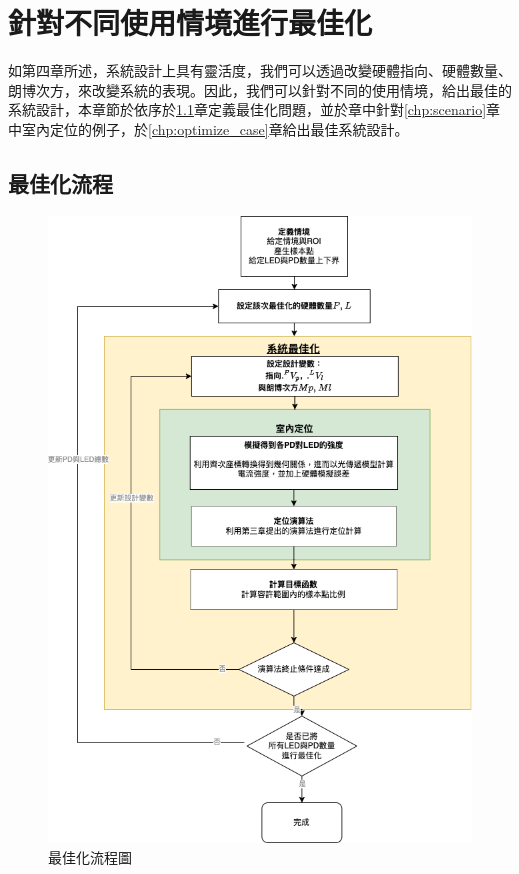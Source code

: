 \chapter{針對不同使用情境進行最佳化}
\label{chp:5}



如第四章所述，系統設計上具有靈活度，我們可以透過改變硬體指向、硬體數量、朗博次方，來改變系統的表現。因此，我們可以針對不同的使用情境，給出最佳的系統設計，本章節於依序於\ref{chp:optimize}章定義最佳化問題，並於章中針對\ref{chp:scenario}章中室內定位的例子，於\ref{chp:optimize_case}章給出最佳系統設計。








\section{最佳化流程}
\label{chp:optimize}

\begin{figure}[htpb]
    \centering
    \includegraphics[width=13cm]{ch5pic/optimize_flow.png}
    \caption{最佳化流程圖}
    \label{pic:optimize_flow}
\end{figure}

